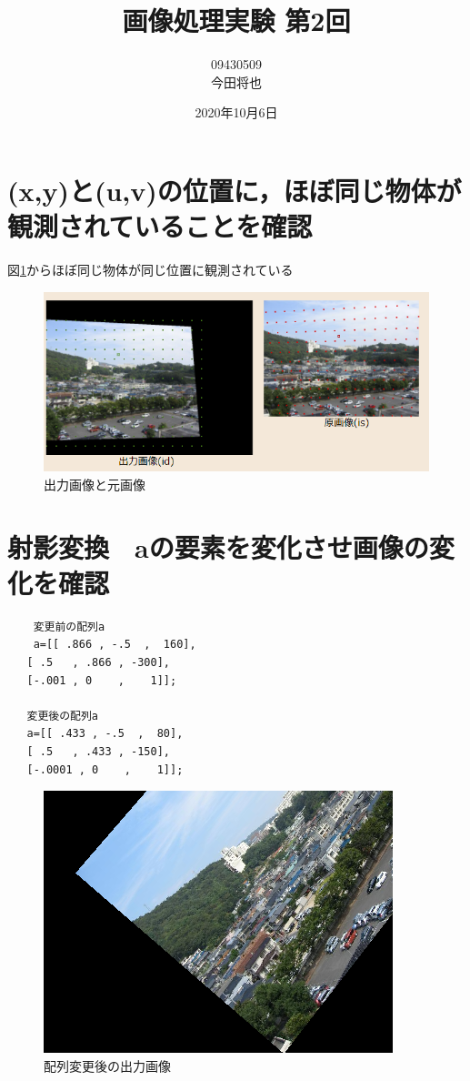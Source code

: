 \documentclass[11pt]{jarticle}
\begin{document}
\title{画像処理実験 第2回}
\author{09430509\\今田将也}
\date{2020年10月6日}
\maketitle

\section{(x,y)と(u,v)の位置に，ほぼ同じ物体が観測されていることを確認}
図\ref{kansoku}からほぼ同じ物体が同じ位置に観測されている
\begin{figure}[h]
    \centering
    \includegraphics[scale=.5]{kansoku.png}
    \caption{出力画像と元画像}
    \label{kansoku}
\end{figure}

\section{射影変換　aの要素を変化させ画像の変化を確認}

\begin{verbatim}
    変更前の配列a
    a=[[ .866 , -.5  ,  160],
   [ .5   , .866 , -300],
   [-.001 , 0    ,    1]];

   変更後の配列a
   a=[[ .433 , -.5  ,  80],
   [ .5   , .433 , -150],
   [-.0001 , 0    ,    1]];
\end{verbatim}
\begin{figure}[h]
    \centering
    \includegraphics[scale=.5]{2kekka.png}
    \caption{配列変更後の出力画像}
\end{figure}
\end{document}
